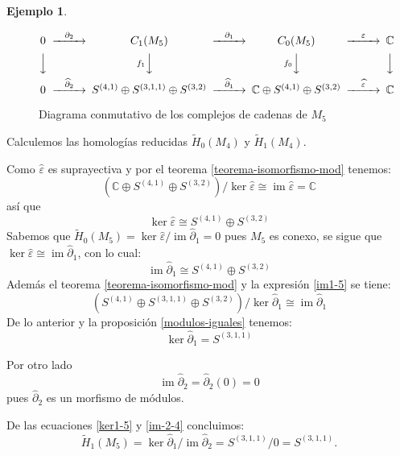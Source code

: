\documentclass[12pt]{book}
\theoremstyle{definition}
\newtheorem{example}[theorem]{Ejemplo}
\DeclareMathOperator{\im}{im}
\newcounter{in}
\begin{document}
\begin{example}
\begin{figure}[h]
  \centering
    \[
    \begin{CD}
      0 @>{\partial_{2}}>> C_{1}(M_{5}) @>{\partial_{1}}>> C_{0}(M_{5}) @>{\varepsilon}>> \mathbb{C}\\
      @VVV   @Vf_{1} VV   @Vf_{0} VV   @VVV    \\
      0 @>{\widehat\partial_{2}}>> S^{(4,1)}\oplus S^{(3,1,1)}\oplus
      S^{(3,2)} @>{\widehat\partial_{1}}>> \mathbb{C}\oplus S^{(4,1)}
      \oplus S^{(3,2)} @>{\widehat \varepsilon}>> \mathbb{C}
    \end{CD}
    \]

    \caption{Diagrama conmutativo de los complejos de cadenas de
      $M_{5}$}
\label{fig:diagrama-conmutativo5}
\end{figure}

Calculemos las homologías reducidas $\widetilde H_{0}(M_{4})$ y
$\widetilde H_{1}(M_{4})$.

Como $\widehat\varepsilon$ es suprayectiva y por el teorema \ref{teorema-isomorfismo-mod} tenemos:
$$(\mathbb{C}\oplus S^{(4,1)} \oplus
S^{(3,2)})/\ker\widehat\varepsilon\cong\im\widehat\varepsilon=\mathbb{C}$$
así que
\begin{equation*}
\label{ker0-5}
\ker\widehat\varepsilon\cong S^{(4,1)} \oplus S^{(3,2)}
\end{equation*}
Sabemos que $\widetilde H_{0}(M_{5})=\ker \widehat\varepsilon/\im
\widehat\partial_{1}=0$ pues $M_{5}$  es
conexo, se sigue que $\ker \widehat\varepsilon\cong
\im\widehat\partial_{1}$, con lo cual:
\begin{equation}
\label{im1-5}
\im \widehat\partial_{1}\cong S^{(4,1)} \oplus S^{(3,2)}
\end{equation}
Además el teorema \ref{teorema-isomorfismo-mod} y la expresión \ref{im1-5} se tiene:
$$(S^{(4,1)}\oplus S^{(3,1,1)}\oplus S^{(3,2)})/\ker
\widehat\partial_{1}\cong \im \widehat\partial_{1}$$
De lo anterior y la proposición \ref{modulos-iguales} tenemos:
\begin{equation}
\label{ker1-5}
\ker \widehat\partial_{1}= S^{(3,1,1)}
\end{equation}

Por otro lado
\begin{equation}
\im\widehat\partial_{2}=\widehat\partial_{2}(0)=0
\label{im-2-4}
\end{equation}
pues $\widehat\partial_{2}$ es un morfismo de módulos.

De las ecuaciones \ref{ker1-5} y \ref{im-2-4} concluimos:
\begin{equation*}
  \widetilde H_{1}(M_{5})=\ker \widehat\partial_{1}/\im \widehat\partial_{2}=S^{(3,1,1)}/0=S^{(3,1,1)}.
\end{equation*}
 

\end{example}
\end{document}
